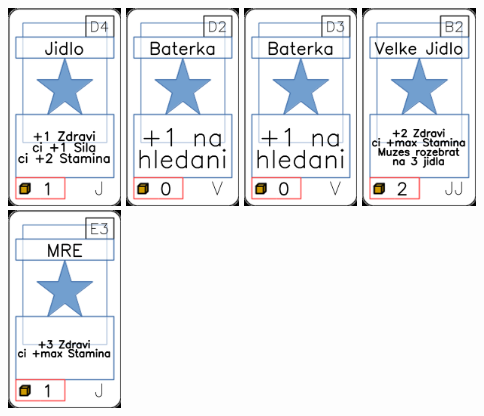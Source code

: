 \documentclass[a4paper]{article}
\begin{document}
	\includegraphics[width=3.0cm]{img-1_18}
	\includegraphics[width=3.0cm]{img-1_76}
	\includegraphics[width=3.0cm]{img-1_77}
	\includegraphics[width=3.0cm]{img-1_36}
	\includegraphics[width=3.0cm]{img-1_22}
\end{document}

